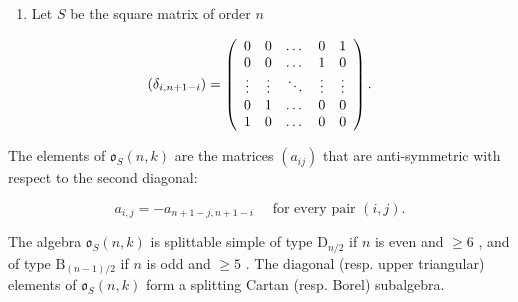 \begin{enumerate}
\def\labelenumi{\arabic{enumi})}
\setcounter{enumi}{3}
\tightlist
\item
  Let \(S\) be the square matrix of order \(n\)
\end{enumerate}

\[
(\delta_ {i, n + 1 - i}) = \left( \begin{array}{c c c c c} 0 & 0 & \dots & 0 & 1 \\ 0 & 0 & \dots & 1 & 0 \\ \vdots & \vdots & \ddots & \vdots & \vdots \\ 0 & 1 & \dots & 0 & 0 \\ 1 & 0 & \dots & 0 & 0 \end{array} \right).
\]

The elements of \(\mathfrak{o}_{S}(n,k)\) are the matrices \((a_{ij})\) that are anti-symmetric with respect to the second diagonal:

\[
a _ {i, j} = - a _ {n + 1 - j, n + 1 - i} \quad \text {   for   every   pair   } (i, j).
\]

The algebra \(\mathfrak{o}_S(n,k)\) is splittable simple of type \(\mathrm{D}_{n/2}\) if \(n\) is even and \(\geq 6\) , and of type \(\mathrm{B}_{(n-1)/2}\) if \(n\) is odd and \(\geq 5\) . The diagonal (resp. upper triangular) elements of \(\mathfrak{o}_S(n,k)\) form a splitting Cartan (resp. Borel) subalgebra.

